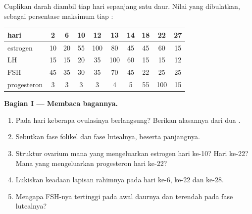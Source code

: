 \begin{problem}
\label{pb:g11:hormones-and-reproduction:1}
Cuplikan darah diambil tiap hari sepanjang satu daur. Nilai yang
dibulatkan, sebagai persentase maksimum tiap :

\begin{center}
\begin{tabular}{lccccccccc}
hari & 2 & 6 & 10 & 12 & 13 & 14 & 18 & 22 & 27 \\ \hline
estrogen & 10 & 20 & 55 & 100 & 80 & 45 & 45 & 60 & 15 \\
LH & 15 & 15 & 20 & 35 & 100 & 60 & 15 & 15 & 12 \\
FSH & 45 & 35 & 30 & 35 & 70 & 45 & 22 & 25 & 25 \\
progesteron & 3 & 3 & 3 & 3 & 4 & 5 & 55 & 100 & 15 \\
\end{tabular}
\end{center}

\medskip
\noindent\textbf{Bagian I --- Membaca bagannya.}
\begin{enumerate}
  \item Pada hari keberapa ovulasinya berlangsung? Berikan alasannya
        dari dua .
  \item Sebutkan fase folikel dan fase lutealnya, beserta panjangnya.
  \item Struktur ovarium mana yang mengeluarkan estrogen hari ke-10?
        Hari ke-22? Mana yang mengeluarkan progesteron hari ke-22?
  \item Lukiskan keadaan lapisan rahimnya pada hari ke-6, ke-22 dan ke-28.
  \item Mengapa FSH-nya tertinggi pada awal daurnya dan terendah pada
        fase lutealnya?
\end{enumerate}


\end{problem}
